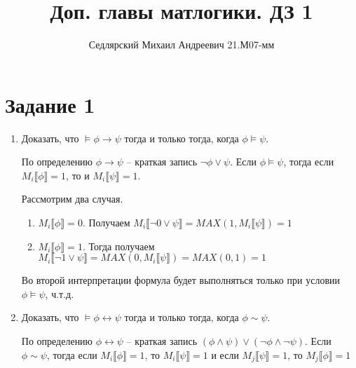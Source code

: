 \documentclass{article}
\title{Доп. главы матлогики. ДЗ 1}
\author{Седлярский Михаил Андреевич 21.М07-мм}
\date{ }
\begin{document}
\maketitle

\section*{Задание 1}
\begin{enumerate}
    \item
        Доказать, что \(\models \phi \rightarrow \psi\) тогда и только тогда, когда \(\phi \models{\psi}\).

        По определению \(\phi \rightarrow \psi\) -- краткая запись \(\neg \phi \lor \psi\).
        Если \(\phi \models{\psi}\), тогда если \(M_i\llbracket \phi \rrbracket = 1\), то и \(M_i\llbracket \psi \rrbracket = 1\).

        Рассмотрим два случая.
        \begin{enumerate}
            \item
                \(M_i\llbracket \phi \rrbracket = 0\).
                Получаем \(M_i\llbracket \neg 0 \lor \psi \rrbracket = MAX(1, M_i\llbracket \psi \rrbracket) = 1\)
            \item
                \(M_i\llbracket \phi \rrbracket = 1\).
                Тогда получаем \(M_i\llbracket \neg 1 \lor \psi \rrbracket = MAX(0, M_i\llbracket \psi \rrbracket) = MAX(0, 1) = 1\)
        \end{enumerate}

        Во второй интерпретации формула будет выполняться только при условии \(\phi \models \psi\), ч.т.д.
    \item
        Доказать, что \(\models \phi \leftrightarrow \psi\) тогда и только тогда, когда \(\phi \sim \psi\).

        По определению \(\phi \leftrightarrow \psi\) -- краткая запись \((\phi \land \psi) \lor (\neg \phi \land \neg \psi)\).
        Если \(\phi \sim \psi\), тогда если \(M_i\llbracket \phi \rrbracket = 1\),
        то \(
        M_i\llbracket \psi \rrbracket = 1\) и если
        \(M_j\llbracket \psi \rrbracket = 1\), то
        \(M_j\llbracket \phi \rrbracket = 1
        \)


\end{enumerate}
\end{document}
